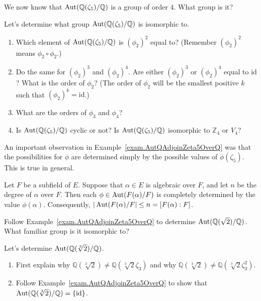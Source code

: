 We now know that $\operatorname{Aut}(\mathbb{Q}(\zeta_5)/\mathbb{Q})$ is a group of order $4$. What group is it? 

\begin{problem}
Let's determine what group $\operatorname{Aut}(\mathbb{Q}(\zeta_5)/\mathbb{Q})$ is isomorphic to. 
\begin{enumerate}
\item Which element of $\operatorname{Aut}(\mathbb{Q}(\zeta_5)/\mathbb{Q})$ is $(\phi_2)^2$ equal to? (Remember $(\phi_2)^2$ means $\phi_2\circ\phi_2$.)
\item Do the same for $(\phi_2)^3$ and $(\phi_2)^4$. Are either $(\phi_2)^3$ or $(\phi_2)^4$ equal to $\text{id}$? What is the order of $\phi_2$? (The order of $\phi_2$ will be the smallest positive $k$ such that $(\phi_2)^k = \text{id}$.)
\item What are the orders of $\phi_3$ and $\phi_4$?
\item Is $\operatorname{Aut}(\mathbb{Q}(\zeta_5)/\mathbb{Q})$ cyclic or not? Is $\operatorname{Aut}(\mathbb{Q}(\zeta_5)/\mathbb{Q})$ isomorphic to $\mathbb{Z}_4$ or $V_4$?
\end{enumerate}
\end{problem}

An important observation in Example~\ref{exam.AutQAdjoinZeta5OverQ} was that the possibilities for $\phi$ are determined simply by the possible values of $\phi(\zeta_5)$. This is true in general.

\begin{fact}\label{fact.AutDeterminedOnGenerator}
Let $F$ be a subfield of $E$. Suppose that $\alpha\in E$ is algebraic over $F$, and let $n$ be the degree of $\alpha$ over $F$. Then each $\phi\in \operatorname{Aut}({F}(\alpha)/F)$ is completely determined by the value $\phi(\alpha)$. Consequently,  $|\operatorname{Aut}({F}(\alpha)/F|\le n = [F(\alpha):F]$.
\end{fact}

\begin{problem}\label{prob.AutQAdjoinSqrt2OverQ}
Follow Example~\ref{exam.AutQAdjoinZeta5OverQ} to determine $\operatorname{Aut}(\mathbb{Q}(\sqrt{2})/\mathbb{Q})$.
What familiar group is  it isomorphic to?
\end{problem}

\begin{problem}\label{prob.AutQAdjoinCubeRoot2OverQ}
Let's determine $\operatorname{Aut}(\mathbb{Q}(\sqrt[3]{2})/\mathbb{Q})$.
\begin{enumerate}
\item First explain why  $\mathbb{Q}(\sqrt[3]{2})\neq \mathbb{Q}(\sqrt[3]{2}\zeta_3)$ and why $\mathbb{Q}(\sqrt[3]{2})\neq \mathbb{Q}(\sqrt[3]{2}\zeta_3^2)$.
\item Follow Example~\ref{exam.AutQAdjoinZeta5OverQ} to show that $\operatorname{Aut}(\mathbb{Q}(\sqrt[3]{2})/\mathbb{Q}) = \{\text{id}\}$.
\end{enumerate}
\end{problem}

